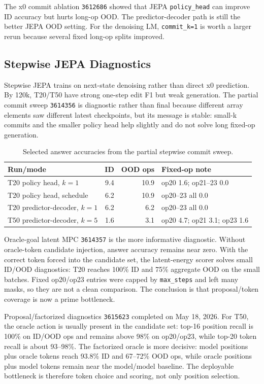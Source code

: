 \documentclass[11pt]{article}
\begin{document}
The x0 commit ablation \texttt{3612686} showed that JEPA \texttt{policy\_head}
can improve ID accuracy but hurts long-op OOD.  The predictor-decoder path is
still the better JEPA OOD setting.  For the denoising LM, \texttt{commit\_k=1}
is worth a larger rerun because several fixed long-op splits improved.

\subsection{Stepwise JEPA Diagnostics}

Stepwise JEPA trains on next-state denoising rather than direct x0 prediction.
By 120k, T20/T50 have strong one-step edit F1 but weak generation.  The partial
commit sweep \texttt{3614356} is diagnostic rather than final because different
array elements saw different latest checkpoints, but its message is stable:
small-k commits and the smaller policy head help slightly and do not solve
long fixed-op generation.
\begin{table}[h]
\centering
\begin{tabular}{lrrl}
\toprule
Run/mode & ID & OOD ops & Fixed-op note \\
\midrule
T20 policy head, $k=1$ & 9.4 & 10.9 & op20 1.6; op21--23 0.0 \\
T20 policy head, schedule & 6.2 & 10.9 & op20--23 all 0.0 \\
T20 predictor-decoder, $k=1$ & 6.2 & 6.2 & op20--23 all 0.0 \\
T50 predictor-decoder, $k=5$ & 1.6 & 3.1 & op20 4.7; op21 3.1; op23 1.6 \\
\bottomrule
\end{tabular}
\caption{Selected answer accuracies from the partial stepwise commit sweep.}
\end{table}

Oracle-goal latent MPC \texttt{3614357} is the more informative diagnostic.
Without oracle-token candidate injection, answer accuracy remains near zero.
With the correct token forced into the candidate set, the latent-energy scorer
solves small ID/OOD diagnostics: T20 reaches 100\% ID and 75\% aggregate OOD on
the small batches.  Fixed op20/op23 entries were capped by \texttt{max\_steps}
and left many masks, so they are not a clean comparison.  The conclusion is that
proposal/token coverage is now a prime bottleneck.

Proposal/factorized diagnostics \texttt{3615623} completed on May 18, 2026.
For T50, the oracle action is usually present in the candidate set:
top-16 position recall is 100\% on ID/OOD ops and remains above 98\% on
op20/op23, while top-20 token recall is about 93--98\%.  The factorized oracle
is more decisive: model positions plus oracle tokens reach 93.8\% ID and
67--72\% OOD ops, while oracle positions plus model tokens remain near the
model/model baseline.  The deployable bottleneck is therefore token choice and
scoring, not only position selection.
\end{document}
